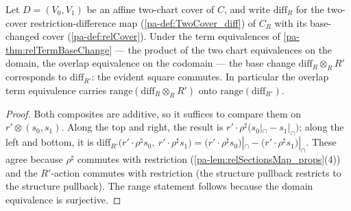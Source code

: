 \begin{lemma}
  \label{pa-lem:relDiffBaseChange}
  \leanok

  Let \(D = (V_0, V_1)\) be an affine two-chart cover of \(C\), and write
  \(\mathrm{diff}_R\) for the two-cover restriction-difference map
  (\ref{pa-def:TwoCover_diff}) of \(C_R\) with its base-changed cover
  (\ref{pa-def:relCover}). Under the term equivalences of \ref{pa-thm:relTermBaseChange} ---
  the product of the two chart equivalences on the domain, the overlap equivalence on the
  codomain --- the base change \(\mathrm{diff}_R \otimes_R R'\) corresponds to
  \(\mathrm{diff}_{R'}\): the evident square commutes. In particular the overlap term
  equivalence carries \(\mathrm{range}(\mathrm{diff}_R \otimes_R R')\) onto
  \(\mathrm{range}(\mathrm{diff}_{R'})\).
\end{lemma}
\begin{proof}
  \leanok
  Both composites are additive, so it suffices to compare them on
  \(r' \otimes (s_0, s_1)\). Along the top and right, the result is
  \(r' \cdot \rho^{\sharp}\bigl(s_0|_{\cap} - s_1|_{\cap}\bigr)\); along the left and
  bottom, it is \(\mathrm{diff}_{R'}\bigl(r' \cdot \rho^{\sharp} s_0,\ r' \cdot
  \rho^{\sharp} s_1\bigr) = \bigl(r' \cdot \rho^{\sharp} s_0\bigr)|_{\cap} -
  \bigl(r' \cdot \rho^{\sharp} s_1\bigr)|_{\cap}\). These agree because
  \(\rho^{\sharp}\) commutes with restriction (\ref{pa-lem:relSectionsMap_props}(4)) and
  the \(R'\)-action commutes with restriction (the structure pullback restricts to the
  structure pullback). The range statement follows because the domain equivalence is
  surjective.
\end{proof}

